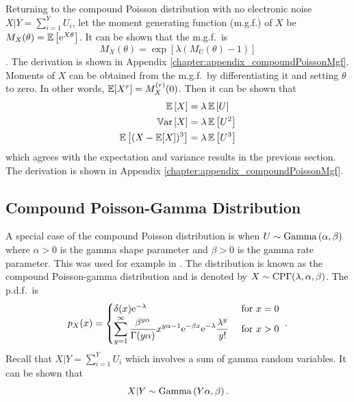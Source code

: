 Returning to the compound Poisson distribution with no electronic noise $X|Y = \sum_{i=1}^{Y}U_i$, let the moment generating function (m.g.f.) of $X$ be $M_X(\theta)=\operatorname{\mathbb{E}}\left[\mathrm{e}^{X\theta}\right]$. It can be shown that the m.g.f.~is
\begin{equation}
  M_X(\theta)=
  \exp\left[
    \lambda
    \left(
      M_U(\theta)-1
    \right)
  \right]
\end{equation}
\citep{gatto2010saddlepoint}. The derivation is shown in Appendix \ref{chapter:appendix_compoundPoissonMgf}. Moments of $X$ can be obtained from the m.g.f.~by differentiating it and setting $\theta$ to zero. In other words, $\operatorname{\mathbb{E}}[X^r]=M_X^{(r)}(0)$. Then it can be shown that
\begin{align}
  \operatorname{\mathbb{E}}\left[X\right]&=\lambda\operatorname{\mathbb{E}}\left[U\right]
  \\
  \operatorname{\mathbb{V}ar}\left[X\right] &= \lambda\operatorname{\mathbb{E}}\left[U^2\right]
  \\
  \operatorname{\mathbb{E}}\left[(X-\operatorname{\mathbb{E}}[X])^3\right] &=\lambda\operatorname{\mathbb{E}}\left[U^3\right]
\end{align}
which agrees with the expectation and variance results in the previous section. The derivation is shown in Appendix \ref{chapter:appendix_compoundPoissonMgf}.

\subsection{Compound Poisson-Gamma Distribution}
\label{chapter:compoundPoisson_compoundPoissonGamma}
A special case of the compound Poisson distribution is when $U\sim\operatorname{Gamma}\left(\alpha,\beta\right)$ where $\alpha>0$ is the gamma shape parameter and $\beta>0$ is the gamma rate parameter. This was used for example in \cite{xu2009electronic}. The distribution is known as the compound Poisson-gamma distribution and is denoted by $X\sim\operatorname{CP\Gamma}(\lambda,\alpha,\beta)$. The p.d.f.~is
\begin{equation}
  p_X(x) = 
  \begin{cases}
    \delta(x) \mathrm{e}^{-\lambda} & \text{ for } x=0 \\ 
    \displaystyle\sum_{y=1}^{\infty}\dfrac{\beta^{y\alpha}}{\Gamma(y\alpha)}x^{y\alpha-1}\mathrm{e}^{-\beta x}\mathrm{e}^{-\lambda}\frac{\lambda^y}{y!} & \text{ for } x>0
  \end{cases}
  \ .
  \label{eq:compoundPoisson_pdf}
\end{equation}
Recall that $X|Y=\sum_{i=1}^YU_i$ which involves a sum of gamma random variables. It can be shown that
\begin{equation}
  X|Y\sim\operatorname{Gamma}\left(Y\alpha,\beta\right).
\end{equation}

